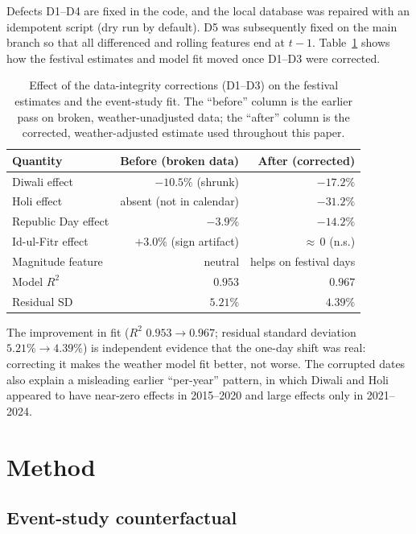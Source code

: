 \documentclass[11pt]{article}
\newcommand{\pct}{\%}
\begin{document}
Defects D1--D4 are fixed in the code, and the local database was repaired with an
idempotent script (dry run by default). D5 was subsequently fixed on the main
branch so that all differenced and rolling features end at $t{-}1$.
Table~\ref{tab:before-after} shows how the festival estimates and model fit moved
once D1--D3 were corrected.

\begin{table}[t]
\centering
\caption{Effect of the data-integrity corrections (D1--D3) on the festival
estimates and the event-study fit. The ``before'' column is the earlier pass on
broken, weather-unadjusted data; the ``after'' column is the corrected,
weather-adjusted estimate used throughout this paper.}
\label{tab:before-after}
\begin{tabular}{@{}lrr@{}}
\toprule
Quantity & Before (broken data) & After (corrected) \\
\midrule
Diwali effect        & $-10.5\pct$ (shrunk) & $-17.2\pct$ \\
Holi effect          & absent (not in calendar) & $-31.2\pct$ \\
Republic Day effect  & $-3.9\pct$  & $-14.2\pct$ \\
Id-ul-Fitr effect    & $+3.0\pct$ (sign artifact) & ${\approx}\,0$ (n.s.) \\
Magnitude feature    & neutral & helps on festival days \\
\midrule
Model $R^2$          & $0.953$ & $0.967$ \\
Residual SD          & $5.21\pct$ & $4.39\pct$ \\
\bottomrule
\end{tabular}
\end{table}

The improvement in fit ($R^2$ $0.953\to0.967$; residual standard deviation
$5.21\pct\to4.39\pct$) is independent evidence that the one-day shift was real:
correcting it makes the weather model fit better, not worse. The corrupted dates
also explain a misleading earlier ``per-year'' pattern, in which Diwali and Holi
appeared to have near-zero effects in 2015--2020 and large effects only in
2021--2024.

\section{Method}
\label{sec:method}

\subsection{Event-study counterfactual}
\end{document}
